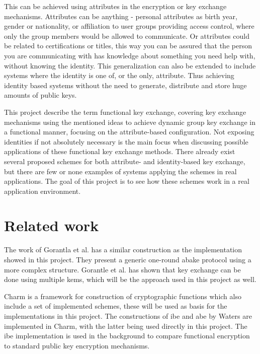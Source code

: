  \par This can be achieved using attributes in the encryption or key exchange mechanisms. Attributes can be anything - personal attributes as birth year, gender or nationality, or affiliation to user groups providing access control, where only the group members would be allowed to communicate. Or attributes could be related to certifications or titles, this way you can be assured that the person you are communicating with has knowledge about something you need help with, without knowing the identity. This generalization can also be extended to include systems where the identity is one of, or the only, attribute. Thus achieving identity based systems without the need to generate, distribute and store huge amounts of public keys. 
\par This project describe the term functional key exchange, covering key exchange mechanisms using the mentioned ideas to achieve dynamic group key exchange in a functional manner, focusing on the attribute-based configuration. Not exposing identities if not absolutely necessary is the main focus when discussing possible applications of these functional key exchange methods. There already exist several proposed schemes for both attribute- and identity-based key exchange, but there are few or none examples of systems applying the schemes in real applications. The goal of this project is to see how these schemes work in a real application environment.

\section{Related work}\label{sec:related_work}
The work of Gorantla et al.\cite{gorantla2010attribute} has a similar construction as the implementation showed in this project. They present a generic one-round \gls{abake} protocol using a more complex structure. Gorantle et al. \cite{kem-group-ke} has shown that key exchange can be done using multiple \glspl{kem}, which will be the approach used in this project as well.
\par Charm \cite{DBLP:Charm13} is a framework for construction of cryptographic functions which also include a set of implemented schemes, these will be used as basis for the implementations in this project. The constructions of \gls{ibe} and \gls{abe} by Waters \cite{ibe_waters09, abe_waters09} are implemented in Charm, with the latter being used directly in this project. The \gls{ibe} implementation is used in the background to compare functional encryption to standard public key encryption mechanisms.

